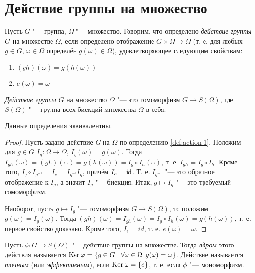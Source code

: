 \documentclass[main]{subfiles}
\begin{document}
\section{Действие группы на множество}
\begin{definition}\label{def:action-1}
  Пусть $G$ "--- группа, $\Omega$ "--- множество. Говорим,
  что определено \emph{действие группы} $G$ на множестве $\Omega$,
  если определено отображение $G \times \Omega \to \Omega$
  (т. е. для любых $g \in G$, $\omega \in \Omega$ определён $g(\omega)
  \in \Omega$), удовлетворяющее следующим свойствам:
  \begin{enumerate}
    \item $(gh)(\omega) = g(h(\omega))$
    \item $e(\omega) = \omega$
  \end{enumerate}
\end{definition}

\begin{definition}\label{def:action-2}
  \emph{Действие группы} $G$ на множество $\Omega$ "--- это гомоморфизм
  $G \to S(\Omega)$, где $S(\Omega)$ "--- группа всех биекций множества
  $\Omega$ в себя.
\end{definition}

\begin{proposition}
  Данные определения эквивалентны.
\end{proposition}
\begin{proof}
  Пусть задано действие $G$ на $\Omega$
  по определению \ref{def:action-1}.
  Положим
  для $g \in G$
  $I_g : \Omega \to \Omega$,
  $I_g(\omega) = g(\omega)$.
  Тогда  $I_{gh}(\omega) = (gh)(\omega) = g(h(\omega)) = I_g \circ I_h(\omega)$,
  т. е. $I_{gh} = I_g \circ I_h$.
  Кроме того, $I_g \circ I_{g^{-1}} = I_e =
  I_{g^{-1}} I_g$,
  причём $I_e = \operatorname{id}$.
  Т. е. $I_{g^{-1}}$ "--- это обратное отображение к $I_g$,
  а значит $I_g$ "--- биекция.
  Итак, $g \mapsto I_g$ "---
  это требуемый гомоморфизм.

  Наоборот,
  пусть $g \mapsto I_g$ "---
  гомоморфизм $G \to S(\Omega)$,
  то положим $g(\omega) = I_g(\omega)$.
  Тогда $(gh)(\omega) = I_{gh}(\omega) = I_g \circ I_h(\omega) = g(h(\omega))$,
  т. е. первое свойство доказано.
  Кроме того, $I_e = id$,
  т. е. $e(\omega) = \omega$.
\end{proof}

\begin{definition}
  Пусть $\phi : G \to S(\Omega)$ "--- действие группы на множестве. Тогда
  \emph{ядром} этого действия называется $\operatorname{Ker} \varphi = \{ g \in G \mid
  \forall {\omega \in \Omega} \; \, g(\omega) = \omega \}$.
  Действие называется  \emph{точным} (или \emph{эффективным}), если
  $\operatorname{Ker} \varphi = \{ e \}$, т. е. если $\phi$ "--- мономорфизм.
\end{definition}
\end{document}
